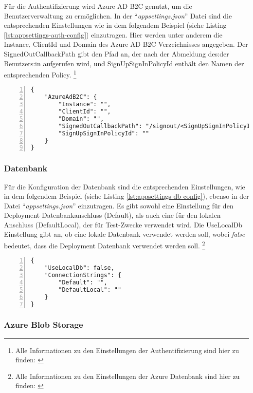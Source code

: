 Für die Authentifizierung wird Azure AD B2C genutzt, um die Benutzerverwaltung zu ermöglichen. 
In der ``\emph{appsettings.json}'' Datei sind die entsprechenden Einstellungen wie in dem folgendem
Beispiel (siehe Listing \ref{lst:appsettings-auth-config}) einzutragen. Hier werden unter anderem die Instance, ClientId und Domain des 
Azure AD B2C Verzeichnisses angegeben. Der SignedOutCallbackPath gibt den Pfad an, der nach 
der Abmeldung des:der Benutzers:in aufgerufen wird, und SignUpSignInPolicyId enthält 
den Namen der entsprechenden Policy. 
\footnote{Alle Informationen zu den Einstellungen der Authentifizierung sind hier zu finden: \cite{MicrosoftCorporationk}}

\begin{lstlisting}[numbers=left,caption={appsettings.json},label={lst:appsettings-auth-config}]
{
    "AzureAdB2C": {
        "Instance": "",
        "ClientId": "",
        "Domain": "",
        "SignedOutCallbackPath": "/signout/<SignUpSignInPolicyId>",
        "SignUpSignInPolicyId": ""
    }
}
\end{lstlisting}

\subsubsection{Datenbank}

Für die Konfiguration der Datenbank sind die entsprechenden Einstellungen, wie in dem folgendem
Beispiel (siehe Listing \ref{lst:appsettings-db-config}), ebenso in der Datei ``\emph{appsettings.json}'' 
einzutragen. Es gibt sowohl eine Einstellung für den Deployment-Datenbankanschluss (Default), 
als auch eine für den lokalen Anschluss (DefaultLocal), der für Test-Zwecke verwendet wird. 
Die UseLocalDb Einstellung gibt an, ob eine lokale Datenbank verwendet werden soll, wobei
\emph{false} bedeutet, dass die Deployment Datenbank verwendet werden soll.
\footnote{Alle Informationen zu den Einstellungen der Azure Datenbank sind hier zu finden: \cite{MicrosoftCorporationl}}

\begin{lstlisting}[numbers=left,caption={appsettings.json},label={lst:appsettings-db-config}]
{
    "UseLocalDb": false,
    "ConnectionStrings": {
        "Default": "",
        "DefaultLocal": ""
    }
}
\end{lstlisting}

\subsubsection{Azure Blob Storage}

